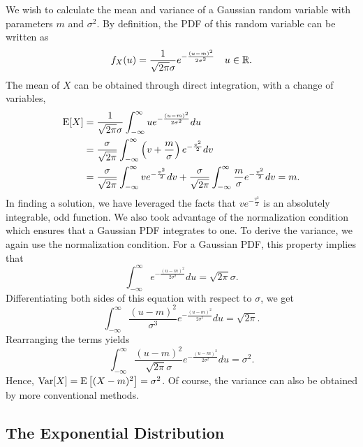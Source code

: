 \begin{example}
We wish to calculate the mean and variance of a Gaussian random variable with parameters $m$ and $\sigma^2$.
By definition, the PDF of this random variable can be written as
\begin{equation*}
f_X (u) = \frac{1}{\sqrt{2 \pi} \sigma} e^{-\frac{(u - m)^2}{2\sigma^2}}
\quad u \in \mathbb{R} .
\end{equation*}
The mean of $X$ can be obtained through direct integration, with a change of variables,
\begin{equation*}
\begin{split}
\mathrm{E} [X]
&= \frac{1}{\sqrt{2 \pi} \sigma} \int_{- \infty}^{\infty} u e^{-\frac{(u-m)^2}{2\sigma^2}} du \\
&= \frac{\sigma}{\sqrt{2 \pi}} \int_{- \infty}^{\infty}
\left( v+\frac{m}{\sigma} \right) e^{-\frac{v^2}{2}} dv \\
&= \frac{\sigma}{\sqrt{2 \pi}} \int_{- \infty}^{\infty}
v e^{-\frac{v^2}{2}} dv
+ \frac{\sigma}{\sqrt{2 \pi}} \int_{- \infty}^{\infty}
\frac{m}{\sigma} e^{-\frac{v^2}{2}} dv
= m.
\end{split}
\end{equation*}
In finding a solution, we have leveraged the facts that $v e^{-\frac{v^2}{2}}$ is an absolutely integrable, odd function.
We also took advantage of the normalization condition which ensures that a Gaussian PDF integrates to one.
To derive the variance, we again use the normalization condition.
For a Gaussian PDF, this property implies that
\begin{equation*}
\int_{-\infty}^{\infty} e^{- \frac{(u-m)^2}{2 \sigma^2}} du
= \sqrt{2 \pi} \sigma .
\end{equation*}
Differentiating both sides of this equation with respect to $\sigma$, we get
\begin{equation*}
\int_{-\infty}^{\infty} \frac{(u-m)^2}{\sigma^3}
e^{- \frac{(u-m)^2}{2 \sigma^2}} du
= \sqrt{2 \pi} .
\end{equation*}
Rearranging the terms yields
\begin{equation*}
\int_{-\infty}^{\infty} \frac{(u-m)^2}{\sqrt{2 \pi} \sigma}
e^{- \frac{(u-m)^2}{2 \sigma^2}} du
= \sigma^2 .
\end{equation*}
Hence, $\mathrm{Var}[X] = \mathrm{E} \left[ (X-m)^2 \right] = \sigma^2$.
Of course, the variance can also be obtained by more conventional methods.
\end{example}

\subsection{The Exponential Distribution}
\label{section:ExponentialDistribution}

